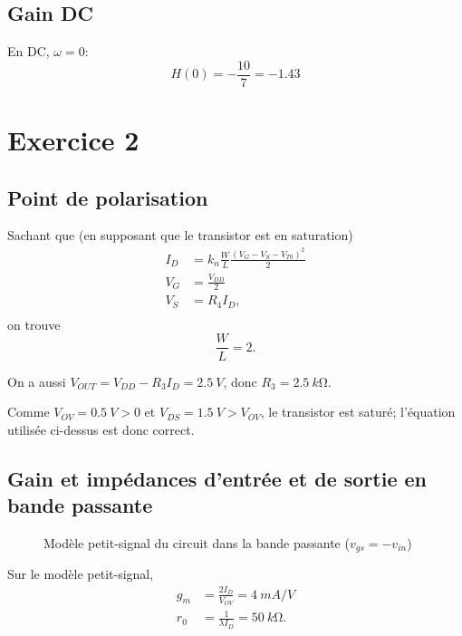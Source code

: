 \documentclass[frenchb,DIV=14]{scrartcl}
\begin{document}

\subsection*{Gain DC}
En DC, $\omega = 0$:
\[H(0) = -\frac{10}{7} = -1.43\]

\section*{Exercice 2}

\subsection*{Point de polarisation}

Sachant que (en supposant que le transistor est en saturation)
\begin{align*}
    I_D &= k_n \frac{W}{L} \frac{\left(V_G - V_S - V_{T0}\right)^2}{2} \\
    V_G &= \frac{V_{DD}}{2} \\
    V_S &= R_4 I_D, \\
\end{align*}
on trouve \[\frac{W}{L} = 2.\]

On a aussi $V_{OUT} = V_{DD} - R_3 I_D = \SI{2.5}{V}$, donc $R_3 = \SI{2.5}{k\ohm}$.

Comme $V_{OV} = \SI{0.5}{V} > 0$ et $V_{DS} = \SI{1.5}{V} > V_{OV}$, le transistor
est saturé; l'équation utilisée ci-dessus est donc correct.

\subsection*{Gain et impédances d'entrée et de sortie en bande passante}
\begin{figure}[h]
    \centering
    \caption{Modèle petit-signal du circuit dans la bande passante ($v_{gs} = -v_{in}$)}
    \label{fig:pt-signal2}
\end{figure}
Sur le modèle petit-signal,
\begin{align*}
    g_m &= \frac{2I_D}{V_{OV}} = \SI{4}{mA/V} \\
    r_0 &= \frac{1}{\lambda I_D} = \SI{50}{k\ohm}.
\end{align*}
\end{document}
